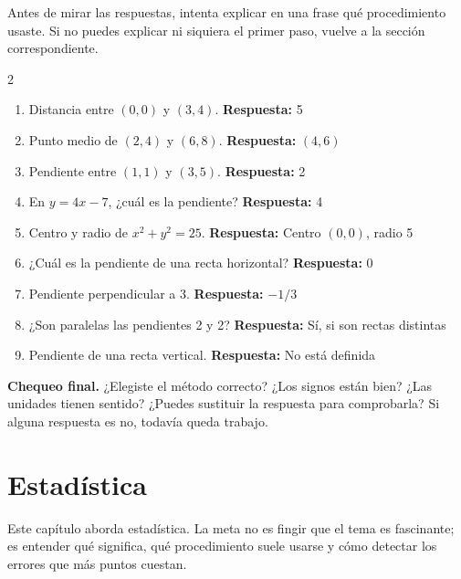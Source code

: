 \documentclass[10pt,oneside,openany]{book}
\begin{document}
Antes de mirar las respuestas, intenta explicar en una frase qué procedimiento usaste. Si no puedes explicar ni siquiera el primer paso, vuelve a la sección correspondiente.

\begin{multicols}{2}\begin{enumerate}

\item Distancia entre $(0,0)$ y $(3,4)$. \textbf{Respuesta:} 5

\item Punto medio de $(2,4)$ y $(6,8)$. \textbf{Respuesta:} $(4,6)$

\item Pendiente entre $(1,1)$ y $(3,5)$. \textbf{Respuesta:} 2

\item En $y=4x-7$, ¿cuál es la pendiente? \textbf{Respuesta:} 4

\item Centro y radio de $x^2+y^2=25$. \textbf{Respuesta:} Centro $(0,0)$, radio 5

\item ¿Cuál es la pendiente de una recta horizontal? \textbf{Respuesta:} 0

\item Pendiente perpendicular a 3. \textbf{Respuesta:} $-1/3$

\item ¿Son paralelas las pendientes 2 y 2? \textbf{Respuesta:} Sí, si son rectas distintas

\item Pendiente de una recta vertical. \textbf{Respuesta:} No está definida

\end{enumerate}\end{multicols}

\begin{idea}\textbf{Chequeo final.} ¿Elegiste el método correcto? ¿Los signos están bien? ¿Las unidades tienen sentido? ¿Puedes sustituir la respuesta para comprobarla? Si alguna respuesta es no, todavía queda trabajo.\end{idea}



\chapter{Estadística}

\begin{idea}
Este capítulo aborda estadística. La meta no es fingir que el tema es fascinante; es entender qué significa, qué procedimiento suele usarse y cómo detectar los errores que más puntos cuestan.
\end{idea}
\end{document}
